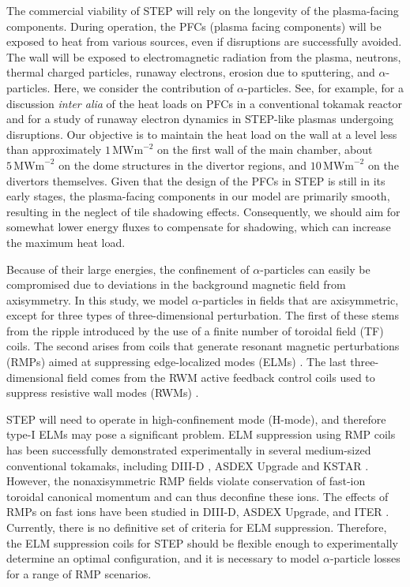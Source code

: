 \documentclass[10pt, a4paper, twoside]{article}
\begin{document}
The commercial viability of STEP will rely on the longevity of the plasma-facing components. During operation, the PFCs (plasma facing components) will be exposed to heat from various sources, even if disruptions are successfully avoided. The wall will be exposed to electromagnetic radiation from the plasma, neutrons, thermal charged particles, runaway electrons, erosion due to sputtering, and $\alpha$-particles. Here, we consider the contribution of $\alpha$-particles. See, for example, \cite{bachmann2018} for a discussion {\it inter alia} of the heat loads on PFCs in a conventional tokamak reactor and \cite{Berger2022} for a study of runaway electron dynamics in STEP-like plasmas undergoing disruptions. Our objective is to maintain the heat load on the wall at a level less than approximately $1\, \text{MWm}^{-2}$ on the first wall of the main chamber, about $5\, \text{MWm}^{-2}$ on the dome structures in the divertor regions, and $10\, \text{MWm}^{-2}$ on the divertors themselves. Given that the design of the PFCs in STEP is still in its early stages, the plasma-facing components in our model are primarily smooth, resulting in the neglect of tile shadowing effects. Consequently, we should aim for somewhat lower energy fluxes to compensate for shadowing, which can increase the maximum heat load.

Because of their large energies, the confinement of $\alpha$-particles can easily be compromised due to deviations in the background magnetic field from axisymmetry.  In this study, we model $\alpha$-particles in fields that are axisymmetric, except for three types of three-dimensional perturbation. The first of these stems from the ripple introduced by the use of a finite number of toroidal field (TF) coils. The second arises from coils that generate resonant magnetic perturbations (RMPs) aimed at suppressing edge-localized modes (ELMs) \cite{zohm1996}. The last three-dimensional field comes from the RWM active feedback control coils used to suppress resistive wall modes (RWMs) \cite{xia2023}.

STEP will need to operate in high-confinement mode (H-mode), and therefore type-I ELMs may pose a significant problem. ELM suppression using RMP coils has been successfully demonstrated experimentally in several medium-sized conventional tokamaks, including DIII-D \cite{Evans2008}, ASDEX Upgrade \cite{suttrop2018} and KSTAR \cite{In2019}. However, the nonaxisymmetric RMP fields violate conservation of fast-ion toroidal canonical momentum and can thus deconfine these ions. The effects of RMPs on fast ions have been studied in DIII-D, ASDEX Upgrade, and ITER \cite{van2015,sanchis2018,ward2022}. Currently, there is no definitive set of criteria for ELM suppression. Therefore, the ELM suppression coils for STEP should be flexible enough to experimentally determine an optimal configuration, and it is necessary to model $\alpha$-particle losses for a range of RMP scenarios.
\end{document}
